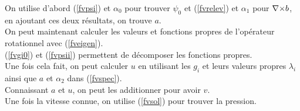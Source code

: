 On utilise d'abord (\ref{fvpsi}) et $\alpha_0$ pour trouver $\psi_0$ et (\ref{fvrelev}) et $\alpha_1$ pour ${\nabla\times} b$, en ajoutant ces deux résultats, on trouve $a$.\\
On peut maintenant calculer les valeurs et fonctions propres de l'opérateur rotationnel avec (\ref{fveigen}).\\
(\ref{fvgi0}) et (\ref{fvpsii}) permettent de décomposer les fonctions propres.\\
Une fois cela fait, on peut calculer $u$ en utilisant les $g_i$ et leurs valeurs propres $\lambda_i$ ainsi que $a$ et $\alpha_2$ dans (\ref{fvspec}).\\
Connaissant $a$ et $u$, on peut les additionner pour avoir $v$.\\
Une fois la vitesse connue, on utilise (\ref{fvsol}) pour trouver la pression.

